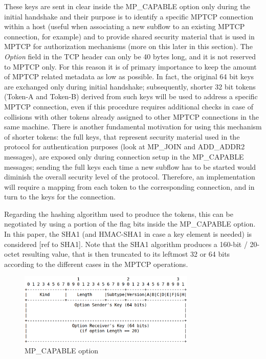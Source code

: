These keys are sent in clear inside the MP\_CAPABLE option only during the initial handshake and their purpose is to identify a specific MPTCP connection within a host (useful when associating a new subflow to an existing MPTCP connection, for example) and to provide shared security material that is used in MPTCP for authorization mechanisms (more on this later in this section). The \textit{Option} field in the TCP header can only be 40 bytes long, and it is not reserved to MPTCP only. For this reason it is of primary importance to keep the amount of MPTCP related metadata as low as possible. In fact, the original 64 bit keys are exchanged only during initial handshake; subsequently, shorter 32 bit tokens (Token-A and Token-B) derived from such keys will be used to address a specific MPTCP connection, even if this procedure requires additional checks in case of collisions with other tokens already assigned to other MPTCP connections in the same machine. There is another fundamental motivation for using this mechanism of shorter tokens: the full keys, that represent security material used in the protocol for authentication purposes (look at MP\_JOIN and ADD\_ADDR2 messages), are exposed only during connection setup in the MP\_CAPABLE messages; sending the full keys each time a new subflow has to be started would diminish the overall security level of the protocol. Therefore, an implementation will require a mapping from each token to the corresponding connection, and in turn to the keys for the connection.


Regarding the hashing algorithm used to produce the tokens, this can be negotiated by using a portion of the flag bits inside the MP\_CAPABLE option. In this paper, the SHA1 (and HMAC-SHA1 in case a key element is needed) is considered [ref to SHA1]. Note that the SHA1 algorithm produces a 160-bit / 20-octet resulting value, that is then truncated to its leftmost 32 or 64 bits according to the different cases in the MPTCP operations.

\begin{figure}[!htb]
\centering
\includegraphics[width=0.75\textwidth]{images/opt_capable}
\caption{MP\_CAPABLE option}
\label{fig:opt_capable}
\end{figure}

